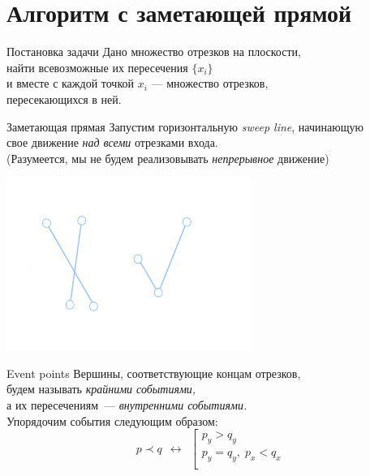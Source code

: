 \section{Алгоритм с заметающей прямой}


\begin{frame}{Постановка задачи}
    Дано множество отрезков на плоскости,\\
    найти всевозможные их пересечения $\{x_i\}$\\
    и вместе с каждой точкой $x_i$ --- множество отрезков,\\
    пересекающихся в ней.
\end{frame}


\begin{frame}{Заметающая прямая}
        Запустим горизонтальную {\it sweep line}, начинающую\\
        свое движение {\it над всеми} отрезками входа.\\
        (Разумеется, мы не будем реализовывать
        {\it непрерывное} движение)
        \vspace{-7mm}
        
        \begin{center}
        \includegraphics[width=0.6\textwidth]{картинки/нормкартинки/sweepline1.pdf}
	\end{center}
\end{frame}

\begin{frame}{Event points}
        Вершины, соответствующие концам отрезков,\\
        будем называть {\it крайними событиями,}\\
        а их пересечениям~— {\it внутренними событиями.}\\
        Упорядочим события следующим образом:
        \[ p \prec q\ \ \longleftrightarrow\ \ \left[ 
      \begin{gathered} 
        p_y > q_y \\ 
        p_y = q_y, \; p_x < q_x \\ 
      \end{gathered} 
       \right. \]
\end{frame}


